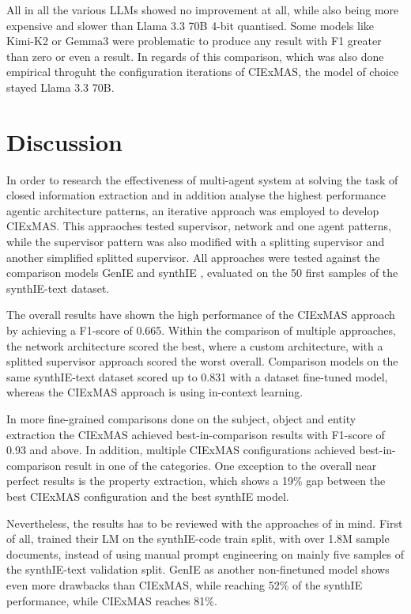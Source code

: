 \documentclass[a4paper,oneside,bibliography=totoc]{scrbook}
\begin{document}
All in all the various \acp{LLM} showed no improvement at all, while also being more expensive and slower than Llama 3.3 70B 4-bit quantised. Some models like Kimi-K2 or Gemma3 were problematic to produce any result with F1 greater than zero or even a result. In regards of this comparison, which was also done empirical throguht the configuration iterations of CIExMAS, the model of choice stayed Llama 3.3 70B.

\section{Discussion}
\label{sec:discussion}

In order to research the effectiveness of multi-agent system at solving the task of closed information extraction and in addition analyse the highest performance agentic architecture patterns, an iterative approach was employed to develop CIExMAS. This appraoches tested supervisor, network and one agent patterns, while the supervisor pattern was also modified with a splitting supervisor and another simplified splitted supervisor. All approaches were tested against the comparison models GenIE and synthIE \cite{Josifoski2021,Josifoski2023}, evaluated on the 50 first samples of the synthIE-text dataset.

The overall results have shown the high performance of the CIExMAS approach by achieving a F1-score of 0.665. Within the comparison of multiple approaches, the network architecture scored the best, where a custom architecture, with a splitted supervisor approach scored the worst overall. Comparison models on the same synthIE-text dataset scored up to 0.831 with a dataset fine-tuned model, whereas the CIExMAS approach is using in-context learning.

In more fine-grained comparisons done on the subject, object and entity extraction the CIExMAS achieved best-in-comparison results with F1-score of 0.93 and above. In addition, multiple CIExMAS configurations achieved best-in-comparison result in one of the categories. One exception to the overall near perfect results is the property extraction, which shows a 19\% gap between the best CIExMAS configuration and the best synthIE model.

Nevertheless, the results has to be reviewed with the approaches of \citet{Josifoski2023,Josifoski2021} in mind. First of all, \citet{Josifoski2023} trained their \ac{LM} on the synthIE-code train split, with over 1.8M sample documents, instead of using manual prompt engineering on mainly five samples of the synthIE-text validation split. GenIE as another non-finetuned model shows even more drawbacks than CIExMAS, while reaching 52\% of the synthIE performance, while CIExMAS reaches 81\%.
\end{document}
